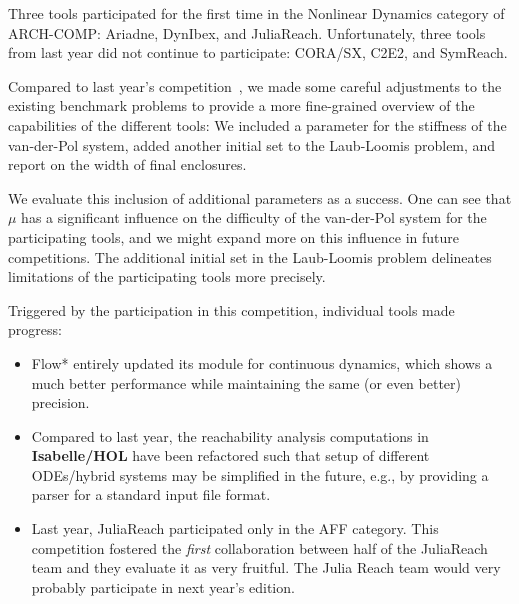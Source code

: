 \documentclass[EPiC]{easychair}
\begin{document}
Three tools participated for the first time in the Nonlinear Dynamics category of ARCH-COMP: Ariadne, DynIbex, and JuliaReach. Unfortunately, three tools from last year did not continue to participate: CORA/SX, C2E2, and SymReach.

Compared to last year's competition~\cite{ARCH_COMP18}, we made some careful adjustments to the existing benchmark problems to provide a more fine-grained overview of the capabilities of the different tools:
We included a parameter for the stiffness of the van-der-Pol system, added another initial set to the Laub-Loomis problem, and report on the width of final enclosures.

We evaluate this inclusion of additional parameters as a success.
One can see that $\mu$ has a significant influence on the difficulty of the van-der-Pol system for the participating tools, and we might expand more on this influence in future competitions. The additional initial set in the Laub-Loomis problem delineates limitations of the participating tools more precisely.

Triggered by the participation in this competition, individual tools made progress:
\begin{itemize}
\item Flow* entirely updated its module for continuous dynamics, which  shows a much better performance while maintaining the same (or even better) precision.
\item Compared to last year, the reachability analysis computations in \textbf{Isabelle/HOL} have been refactored such that setup of different ODEs/hybrid systems may be simplified in the future, e.g., by providing a parser for a standard input file format.
\item Last year, JuliaReach participated only in the AFF category.
This competition fostered the \emph{first} collaboration between half of the JuliaReach team and they evaluate it as very fruitful. The Julia Reach team would very probably participate in next year's edition.

\end{itemize}
\end{document}
